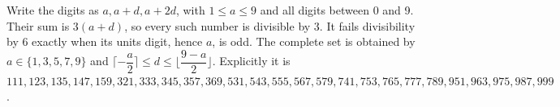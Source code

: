 Write the digits as $a,a+d,a+2d$, with $1\le a\le9$ and all digits between 0 and 9. Their sum is $3(a+d)$, so every such number is divisible by 3. It fails divisibility by 6 exactly when its units digit, hence $a$, is odd. The complete set is obtained by $a\in\{1,3,5,7,9\}$ and $\lceil-\dfrac{a}{2}\rceil\le d\le\lfloor\dfrac{9-a}{2}\rfloor$. Explicitly it is $\boxed{111,123,135,147,159,321,333,345,357,369,531,543,555,567,579,741,753,765,777,789,951,963,975,987,999}$.
